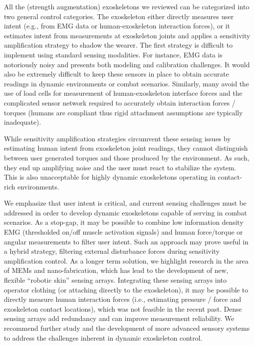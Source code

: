\documentclass[letterpaper,12pt,fullpage]{article}
\begin{document}
All the (strength augmentation) exoskeletons we reviewed can be categorized into two general control categories.  The exoskeleton either directly measures user intent (e.g., from EMG data or human-exoskeleton interaction forces), or it estimates intent from measurements at exoskeleton joints and applies a sensitivity amplification strategy to shadow the wearer.  The first strategy is difficult to implement using standard sensing modalities.  For instance, EMG data is notoriously noisy and presents both modeling and calibration challenges.  It would also be extremely difficult to keep these sensors in place to obtain accurate readings in dynamic environments or combat scenarios.  Similarly, many avoid the use of load cells for measurement of human-exoskeleton interface forces and the complicated sensor network required to accurately obtain interaction forces / torques (humans are compliant thus rigid attachment assumptions are typically inadequate).

While sensitivity amplification strategies circumvent these sensing issues by estimating human intent from exoskeleton joint readings, they cannot distinguish between user generated torques and those produced by the environment.  As such, they end up amplifying noise and the user must react to stabilize the system.  This is also unacceptable for highly dynamic exoskeletons operating in contact-rich environments.

We emphasize that user intent is critical, and current sensing challenges must be addressed in order to develop dynamic exoskeletons capable of serving in combat scenarios.  As a stop-gap, it may be possible to combine low information density EMG (thresholded on/off muscle activation signals) and human force/torque or angular measurements to filter user intent.  Such an approach may prove useful in a hybrid strategy, filtering external disturbance forces during sensitivity amplification control.  As a longer term solution, we highlight research in the area of MEMs and nano-fabrication, which has lead to the development of new, flexible ``robotic skin'' sensing arrays.  Integrating these sensing arrays into operator clothing (or attaching directly to the exoskeleton), it may be possible to directly measure human interaction forces (i.e., estimating pressure / force and exoskeleton contact locations), which was not feasible in the recent past.  Dense sensing arrays add redundancy and can improve measurement reliability. We recommend further study and the development of more advanced sensory systems to address the challenges inherent in dynamic exoskeleton control.
\end{document}
